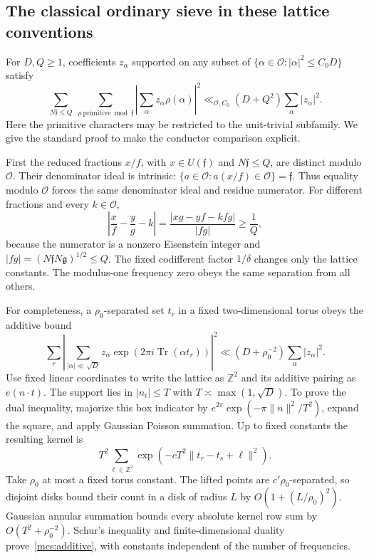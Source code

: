 \subsection{The classical ordinary sieve in these lattice conventions}
For $D,Q\ge1$, coefficients $z_\alpha$ supported on any subset of
$\{\alpha\in\mathcal O:|\alpha|^2\le C_0D\}$ satisfy
\begin{equation}\label{mcs:ordinary}
 \sum_{N\mathfrak f\le Q}\ \sum_{\rho\ \mathrm{primitive}\bmod\mathfrak f}
 \left|\sum_\alpha z_\alpha\rho(\alpha)\right|^2
 \ll_{\mathcal O,C_0}(D+Q^2)\sum_\alpha|z_\alpha|^2.
\end{equation}
Here the primitive characters may be restricted to the unit-trivial
subfamily. We give the standard proof to make the conductor comparison
explicit.

First the reduced fractions $x/f$, with $x\in U(\mathfrak f)$ and
$N\mathfrak f\le Q$, are distinct modulo $\mathcal O$.
Their denominator ideal is intrinsic:
$\{a\in\mathcal O:a(x/f)\in\mathcal O\}=\mathfrak f$.
Thus equality modulo $\mathcal O$ forces the same denominator ideal
and residue numerator. For different fractions and every $k\in\mathcal O$,
\[
 \left|\frac{x}{f}-\frac{y}{g}-k\right|
   =\frac{|xg-yf-kfg|}{|fg|}\ge\frac1Q,
\]
because the numerator is a nonzero Eisenstein integer and
$|fg|=(N\mathfrak f N\mathfrak g)^{1/2}\le Q$.
The fixed codifferent factor $1/\delta$ changes only the lattice constants.
The modulus-one frequency zero obeys the same separation from all others.

For completeness, a $\rho_0$-separated set $t_r$ in a fixed
two-dimensional torus obeys the additive bound
\begin{equation}\label{mcs:additive}
 \sum_r\left|\sum_{|\alpha|\ll\sqrt D}
        z_\alpha\exp(2\pi i\operatorname{Tr}(\alpha t_r))\right|^2
       \ll(D+\rho_0^{-2})\sum_\alpha|z_\alpha|^2.
\end{equation}
Use fixed linear coordinates to write the lattice as $\mathbb Z^2$ and
its additive pairing as $e(n\cdot t)$. The support lies in
$|n_i|\le T$ with $T\asymp\max(1,\sqrt D)$.
To prove the dual inequality, majorize this box indicator by
$e^{2\pi}\exp(-\pi\|n\|^2/T^2)$, expand the square, and apply Gaussian
Poisson summation. Up to fixed constants the resulting kernel is
\[
 T^2\sum_{\ell\in\mathbb Z^2}
       \exp(-cT^2\|t_r-t_s+\ell\|^2).
\]
Take $\rho_0$ at most a fixed torus constant. The lifted points are
$c'\rho_0$-separated, so disjoint disks bound their count in a disk
of radius $L$ by $O(1+(L/\rho_0)^2)$.
Gaussian annular summation bounds every absolute kernel row sum by
$O(T^2+\rho_0^{-2})$. Schur's inequality and finite-dimensional duality
prove~\eqref{mcs:additive}, with constants independent of the number
of frequencies.


